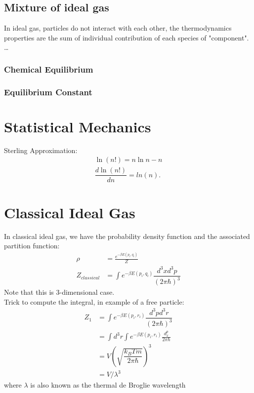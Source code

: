 \documentclass[12pt,a4paper]{article}
\begin{document}
    \subsection {Mixture of ideal gas}
        In ideal gas, particles do not interact with each other, the thermodynamics properties are the sum of individual contribution of each species of "component".
        \dots
        \subsubsection{Chemical Equilibrium}
        \subsubsection{Equilibrium Constant}
\section{Statistical Mechanics}
    \begin{theorem}
        {Sterling Approximation:}
        {
            \begin{align*}
                \ln(n!)= n\ln{n} - n \\
                \dfrac{d\ln(n!)}{dn} = ln(n).
            \end{align*}
            }
    \end{theorem}
        
\section{Classical Ideal Gas}
    In classical ideal gas, we have the probability density function and the associated partition function:
    \begin{align*}
        \rho &= \frac{e^{-\beta E({p_i,q_i})}}{Z}\\
        Z_{classical} &= \int e^{-\beta E({p_i,q_i})} \dfrac{d^3x d^3p}{(2\pi\hbar)^3}
    \end{align*}
    Note that this is 3-dimensional case.\\
    Trick to compute the integral, in example of a free particle:
    \begin{align*}
        Z_1 &= \int e^{-\beta E({p_i,r_i})} \dfrac{d^3p d^3r}{(2\pi\hbar)^3}\\
            &= \int d^3r \int e^{-\beta E({p_i,r_i})} \frac{d^p_x}{2\pi\hbar}\\
            &= V(\sqrt{\dfrac{k_BTm}{2\pi\hbar}})^3\\
            &= V/\lambda^3
    \end{align*}
    where $\lambda$ is also known as the thermal de Broglie wavelength 
    
\end{document}
